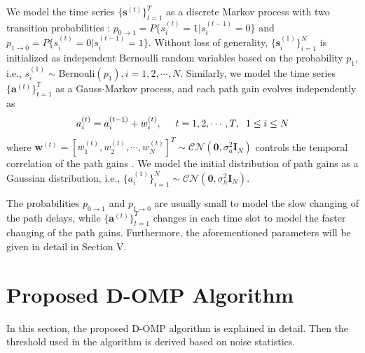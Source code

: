 \documentclass[conference]{IEEEtran}
\begin{document}
We model the time series $\{\mathbf{s}^{(t)}\}_{t=1}^{T}$ as a discrete Markov process with two transition probabilities \cite{Markov}: $p_{0\rightarrow 1}=P\{s_i^{(t)}=1|s_i^{(t-1)}=0\}$ and $p_{1\rightarrow 0}=P\{s_i^{(t)}=0|s_i^{(t-1)}=1\}$. Without loss of generality, $\{\mathbf{s}_i^{(1)}\}_{i=1}^{N}$ is initialized as independent Bernoulli random variables based on the probability $p_1$, i.e., $s_i^{(1)}\sim$Bernouli$(p_1), i=1, 2, \cdots, N$.
Similarly, we model the time series $\{\mathbf{a}^{(t)}\}_{t=1}^{T}$ as a Gauss-Markov process, and each path gain evolves independently as
\begin{equation}
\label{a=a+w}
a_i^{(t)}=a_i^{(t-1)}+w_i^{(t)},\hspace{0.5cm} t=1, 2, \cdots, T, \hspace{0.2cm}1\leq i\leq N
\end{equation}
where $\mathbf{w}^{(t)}=[w_1^{(t)}, w_2^{(t)}, \cdots, w_N^{(t)}]^T\sim\mathcal{CN}(\mathbf{0}, \sigma_a^2\mathbf{I}_N)$ controls the temporal correlation of the path gains \cite{Markov}. We model the initial distribution of path gains as a Gaussian distribution, i.e., $\{a_i^{(1)}\}_{i=1}^{N}\sim\mathcal{CN}(\mathbf{0}, \sigma_h^2\mathbf{I}_N)$. %

The probabilities $p_{0\rightarrow 1}$ and $p_{1\rightarrow 0}$ are usually small to model the slow changing of the path delays, while $\{\mathbf{a}^{(t)}\}_{t=1}^T$ changes in each time slot to model the faster changing of the path gains. Furthermore, the aforementioned parameters will be given in detail in Section V.

\section{Proposed D-OMP Algorithm}
In this section, the proposed D-OMP algorithm is explained in detail. Then the threshold used in the algorithm is derived based on noise statistics.
\end{document}
